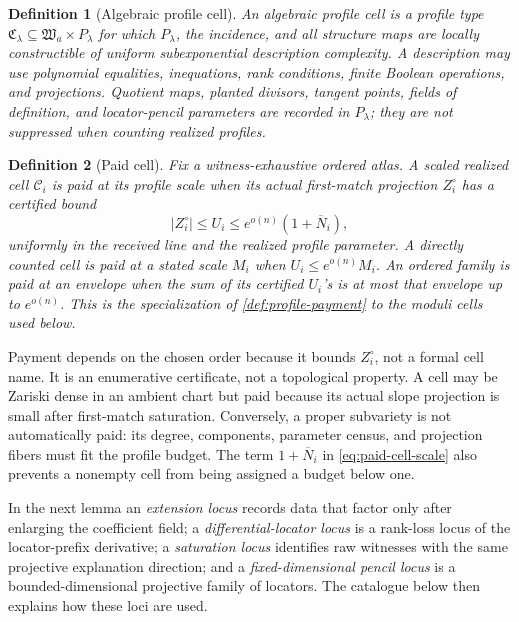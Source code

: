 \documentclass[12pt,a4paper]{amsart}
\numberwithin{equation}{section}
\newtheorem{definition}[definition]{Definition}
\theoremstyle{remark}
\newcommand{\Ccal}{\mathcal C}
\newcommand{\barN}{\overline N}
\newcommand{\abs}[1]{\lvert #1\rvert}
\begin{document}
\begin{definition}[Algebraic profile cell]\label{def:cell}
An \emph{algebraic profile cell} is a profile type
\(\mathfrak C_\lambda\subseteq\mathfrak W_a\times P_\lambda\) for which
\(P_\lambda\), the incidence, and all structure maps are locally
constructible of uniform subexponential description complexity.  A
description may use polynomial equalities, inequations, rank conditions,
finite Boolean operations, and projections.  Quotient maps, planted
divisors, tangent points, fields of definition, and locator-pencil
parameters are recorded in \(P_\lambda\); they are not suppressed when
counting realized profiles.
\end{definition}

\begin{definition}[Paid cell]\label{def:paid-cell}
Fix a witness-exhaustive ordered atlas.  A scaled realized cell \(\Ccal_i\)
is \emph{paid at its profile scale} when its actual first-match projection
\(Z_i^\circ\) has a certified bound
\[
       \abs{Z_i^\circ}\le U_i
          \le e^{o(n)}(1+\barN_i),
 \tag{5.1}\label{eq:paid-cell-scale}
\]
uniformly in the received line and the realized profile parameter.  A
directly counted cell is paid at a stated scale \(M_i\) when
\(U_i\le e^{o(n)}M_i\).  An ordered family is paid at an envelope when
the sum of its certified \(U_i\)'s is at most that envelope up to
\(e^{o(n)}\).  This is the specialization of
\cref{def:profile-payment} to the moduli cells used below.
\end{definition}

Payment depends on the chosen order because it bounds \(Z_i^\circ\), not a
formal cell name.  It is an enumerative certificate, not a topological
property.  A cell may be Zariski dense in an ambient chart but paid because
its actual slope projection is small after first-match saturation.
Conversely, a proper subvariety is not automatically paid: its degree,
components, parameter census, and projection fibers must fit the profile
budget.  The term \(1+\barN_i\) in \eqref{eq:paid-cell-scale} also prevents
a nonempty cell from being assigned a budget below one.

In the next lemma an \emph{extension locus} records data that factor only
after enlarging the coefficient field; a \emph{differential-locator
locus} is a rank-loss locus of the locator-prefix derivative; a
\emph{saturation locus} identifies raw witnesses with the same projective
explanation direction; and a \emph{fixed-dimensional pencil locus} is a
bounded-dimensional projective family of locators.  The catalogue below
then explains how these loci are used.
\end{document}
